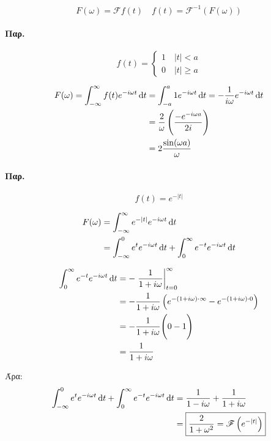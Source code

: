 \documentclass[11pt,a4paper,titlepage,draft]{article}
\begin{document}
\begin{tcolorbox}
\[
F(\omega) = \mathscr{F} f(t)
\quad
f(t) = \mathscr{F}^{-1} \left( F(\omega) \right)
\]
\end{tcolorbox}

\paragraph{Παρ.}
\[
f(t)=
\begin{cases}
1 \quad |t|<a\\
0 \quad |t|\geq a
\end{cases}
\]

\begin{align*}
F(\omega) = \int_{-\infty}^\infty f(t)e^{-i\omega t} \dif t
&= \int_{-a}^a 1 e^{-i \omega t} \dif t = -\frac{1}{i \omega } e^{-i \omega t} \dif t
\\
&=
\frac{2}{\omega}
\left(
\frac{-e^{-i \omega a}}{2i}
\right)
\\ &= 2 \frac{\sin( \omega a)}{\omega}
\end{align*}

\paragraph{Παρ.}
\[
f(t)=e^{-|t|}
\]

\begin{align*}
F( \omega )&=\int_{- \infty }^ \infty e^{-|t|} e^{-i \omega t} \dif t
\\ &=
\int_{- \infty }^0 e^t e^{-i \omega t} \dif t
+ \int_0^ \infty e^{-t}e^{-i \omega t} \dif t
\end{align*}

\begin{align*}
\int_0^ \infty e^{-t}e^{-i \omega t} \dif t &=
-\left. \frac{1}{1+i\omega} \right|_{t=0}^\infty
\\
&= -\frac{1}{1+i\omega} \left(
e^{-(1+i \omega )\cdot\infty}-e^{-(1+i \omega )\cdot0}
\right)
\\ &=
-\frac{1}{1+i\omega}
\Bigg(
0-1
\Bigg)
\\ &= \frac{1}{1+i\omega}
\end{align*}


Άρα:
\begin{align*}
\int_{- \infty }^0 e^t e^{-i \omega t} \dif t
+ \int_0^ \infty e^{-t}e^{-i \omega t} \dif t
&= \frac{1}{1-i \omega }+\frac{1}{1+i \omega }\\
&=
\boxed{
\frac{2}{1+\omega^2} = \mathscr{F} \left(
e^{-|t|}
\right)
}
\end{align*}
\end{document}
